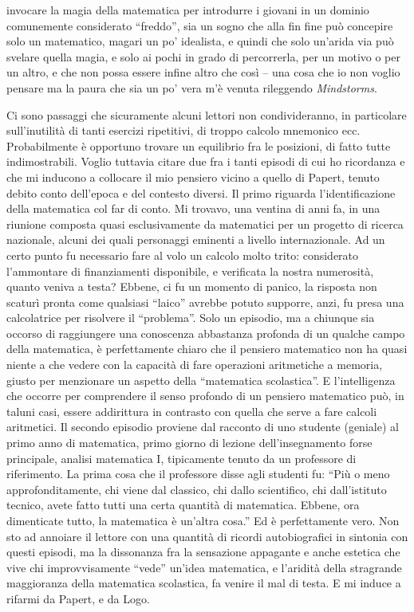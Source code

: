 invocare la magia della matematica per introdurre i giovani in un dominio comunemente considerato “freddo”, sia un sogno che alla fin fine può concepire solo un matematico, magari un po' idealista, e quindi che solo un'arida via può svelare quella magia, e solo ai pochi in grado di percorrerla, per un motivo o per un altro, e che non possa essere infine altro che così – una cosa che io non voglio pensare ma la paura che sia un po' vera m'è venuta rileggendo \textit{Mindstorms}.

Ci sono passaggi che sicuramente alcuni lettori non condivideranno, in particolare sull'inutilità di tanti esercizi ripetitivi, di troppo calcolo mnemonico ecc. Probabilmente è opportuno trovare un equilibrio fra le posizioni, di fatto tutte indimostrabili. Voglio tuttavia citare due fra i tanti episodi di cui ho ricordanza e che mi inducono a collocare il mio pensiero vicino a quello di Papert, tenuto debito  conto dell'epoca e del contesto diversi. Il primo riguarda l'identificazione della matematica col far di conto. Mi trovavo, una ventina di anni fa, in una riunione composta quasi esclusivamente da matematici per un progetto di ricerca nazionale, alcuni dei quali personaggi eminenti a livello internazionale. Ad un certo punto fu necessario fare al volo un calcolo molto trito: considerato l'ammontare di finanziamenti disponibile, e verificata la nostra numerosità, quanto veniva a testa? Ebbene, ci fu un momento di panico, la risposta non scaturì pronta come qualsiasi “laico” avrebbe potuto supporre, anzi, fu presa una calcolatrice per risolvere il “problema”. Solo un episodio, ma a chiunque sia occorso di raggiungere una conoscenza abbastanza profonda di un qualche campo della matematica, è perfettamente chiaro che il pensiero matematico non ha quasi niente a che vedere con la capacità di fare operazioni aritmetiche a memoria, giusto per menzionare un aspetto della “matematica scolastica”. E l'intelligenza che occorre per comprendere il  senso profondo di un pensiero matematico può, in taluni casi, essere addirittura in contrasto con quella che serve a fare calcoli aritmetici. Il secondo episodio proviene dal racconto di uno studente (geniale) al primo anno di matematica, primo giorno di lezione dell'insegnamento forse principale, analisi matematica I, tipicamente tenuto da un professore di riferimento. La prima cosa che il professore disse agli studenti fu: “Più o meno approfonditamente, chi viene dal classico, chi dallo scientifico, chi dall'istituto tecnico, avete fatto tutti una certa quantità di matematica. Ebbene, ora dimenticate tutto, la matematica è un'altra cosa.”  Ed è perfettamente vero. Non sto ad annoiare il lettore con una quantità di ricordi autobiografici in sintonia con questi episodi, ma la dissonanza fra la sensazione appagante e anche estetica  che vive chi improvvisamente “vede” un'idea matematica, e l'aridità della stragrande maggioranza della matematica scolastica, fa venire il mal di testa. E mi induce a rifarmi da Papert, e da Logo.

